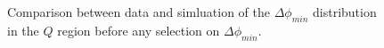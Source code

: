 \begin{figure}[htbp]
\centering
\caption{Comparison between data and simluation of the $\Delta\phi_{min}$ distribution in the $Q$
region before any selection on $\Delta\phi_{min}$.
\label{fig:boost_Q_region_mindeltaphi}}
\end{figure}
% 
% 
% 
% 
% 
% 
